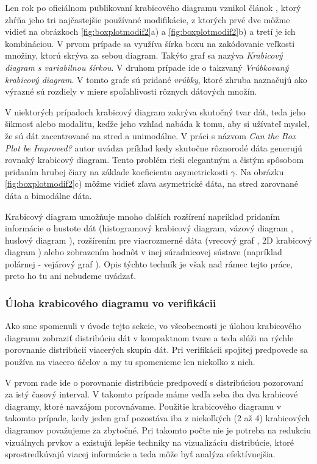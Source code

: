 Len rok po oficiálnom publikovaní krabicového diagramu vznikol článok \cite{McGill}, ktorý zhŕňa jeho tri najčastejšie používané modifikácie, z ktorých prvé dve môžme vidieť na obrázkoch \ref{fig:boxplotmodif2}a) a \ref{fig:boxplotmodif2}b) a tretí je ich kombináciou. V prvom prípade sa využíva šírka boxu na zakódovanie veľkosti množiny, ktorú skrýva za sebou diagram. Takýto graf sa nazýva \textit{Krabicový diagram s variabilnou šírkou}.  
V druhom prípade ide o takzvaný \textit{Vrúbkovaný krabicový diagram}. V tomto grafe sú pridané \textit{vrúbky}, ktoré zhruba naznačujú ako výrazné sú rozdiely v miere spoľahlivosti rôznych dátových množín. 

V niektorých prípadoch krabicový diagram zakrýva skutočný tvar dát, teda jeho šikmosť alebo modalitu, keďže jeho vzhľad nabáda k tomu, aby si užívateľ myslel, že sú dát zacentrované na stred a unimodálne. V práci s názvom \textit{Can the Box Plot be Improved?} \cite{Chamnein} autor uvádza príklad kedy skutočne rôznorodé dáta generujú rovnaký krabicový diagram. Tento problém rieši elegantným a čistým spôsobom pridaním hrubej čiary na základe koeficientu asymetrickosti $ \gamma $. Na obrázku \ref{fig:boxplotmodif2}c) môžme vidieť zľava asymetrické dáta, na stred zarovnané dáta a bimodálne dáta.

Krabicový diagram umožňuje mnoho ďalších rozšírení napríklad pridaním informácie o hustote dát (histogramový krabicový diagram, vázový diagram \cite{HistVasePlot} , huslový diagram \cite{ViolinPlot}), rozšírením pre viacrozmerné dáta (vrecový graf \cite{Bagplot}, 2D krabicový diagram \cite{Boxplot2D} ) alebo zobrazením hodnôt v inej súradnicovej sústave (napríklad polárnej - vejárový graf \cite{FanChart}). Opis týchto techník je však nad rámec tejto práce, preto ho tu ani nebudeme uvádzať.

\subsubsection{Úloha krabicového diagramu vo verifikácii}

Ako sme spomenuli v úvode tejto sekcie, vo všeobecnosti je úlohou krabicového diagramu zobraziť distribúciu dát v kompaktnom tvare a teda slúži na rýchle porovnanie distribúcií viacerých skupín dát.
Pri verifikácii spojitej predpovede sa používa na viacero účelov a my tu spomenieme len niekoľko z nich. 

V prvom rade ide o porovnanie distribúcie predpovedí s distribúciou pozorovaní za istý časový interval. V takomto prípade máme vedľa seba iba dva krabicové diagramy, ktoré navzájom porovnávame. Použitie krabicového diagramu v takomto prípade, kedy jeden graf pozostáva iba z niekoľkých (2 až 4) krabicových diagramov považujeme za zbytočné. Pri takomto počte nie je potreba na redukciu vizuálnych prvkov a existujú lepšie techniky na vizualizáciu distribúcie, ktoré sprostredkúvajú viacej informácie a teda môže byť analýza efektívnejšia. 

